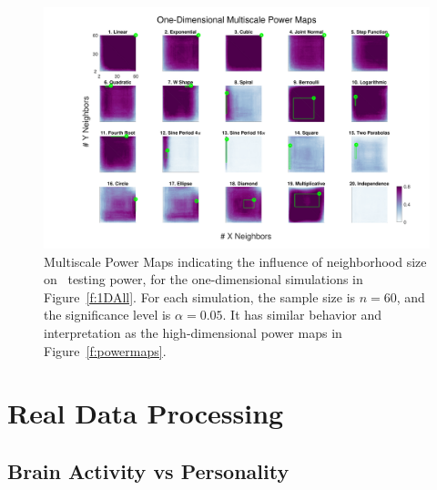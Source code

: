 \documentclass[11pt]{extarticle}
\begin{document}
\begin{figure}[htbp]
\includegraphics[width=1.0\textwidth,trim={3cm 0.5cm 1.8cm 0.5cm},clip]{Figures/Fig1DHeat}
\caption{Multiscale Power Maps indicating the influence of neighborhood size on \Mgc~testing power, for the one-dimensional simulations in Figure~\ref{f:1DAll}. For each simulation,  the sample size is $n=60$, and the significance level is $\alpha=0.05$. It has similar behavior and interpretation as the high-dimensional power maps in Figure~\ref{f:powermaps}.}
\label{f:powermaps1}
\end{figure}

\clearpage
\section{Real Data Processing}
\label{appen:real}

\subsection{Brain Activity vs Personality}
\label{app:personality}
\end{document}
